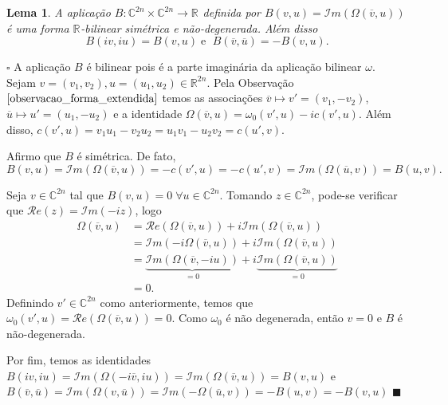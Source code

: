 \documentclass[12pt]{book}
\newtheorem{lema}[teorema]{Lema}
\newenvironment{prova}[1]{$\square$ #1}{\hfill$\blacksquare$}
\newcommand{\complexo}[1]{\mathbb{C}^{#1}}
\newcommand{\formaSimpleticaExtendida}[2]{\Omega(#1, #2)}
\newcommand{\formaSimpleticaPadrao}[2]{\omega_{0}(#1, #2)}
\newcommand{\parteImaginaria}[1]{\mathcal{I}m(#1)}
\newcommand{\parteReal}[1]{\mathcal{R}e(#1)}
\newcommand{\real}[1]{\mathbb{R}^{#1}}
\newcommand{\reta}{\real{}}
\begin{document}
	\begin{lema}
		A aplicação $B:\complexo{2n}\times \complexo{2n} \to \reta$ definida por $B(v, u ) = \parteImaginaria{\formaSimpleticaExtendida{\overline{v}}{u}}$ é uma forma $\reta$-bilinear simétrica e não-degenerada. Além disso
		$$
		B(iv,iu) = B(v,u)\;\text{e }\;B(\overline{v},\overline{u})=-B(v,u).
		$$
	\end{lema}
	\begin{prova}
		A aplicação $B$ é bilinear pois é a parte imaginária da aplicação bilinear $\omega$. Sejam $v = (v_{1},  v_{2}), u = (u_{1},  u_{2}) \in \real{2n}$. Pela Observação $\ref{observacao_forma_extendida}$ temos as associações $\overline{v}\mapsto v' = (v_{1}, -v_{2})$,  $\overline{u}\mapsto u' = (u_{1}, -u_{2})$ e a identidade $\formaSimpleticaExtendida{\overline{v}}{u} = \formaSimpleticaPadrao{v'}{u} -ic(v',u)$. Além disso, $c(v',u) = v_{1}u_{1} - v_{2}u_{2} = u_{1}v_{1} - u_{2}v_{2} = c(u',v)$. 
		
		Afirmo que $B$ é simétrica. De fato,
		$$B(v,u) =\parteImaginaria{\formaSimpleticaExtendida{\overline{v}}{u}} =-c(v',u) = -c(u',v) = \parteImaginaria{\formaSimpleticaExtendida{\overline{u}}{v}} = B(u,v).
		$$
		
		Seja $v \in \complexo{2n}$ tal que $B(v, u) = 0 \; \forall u \in \complexo{2n}$. Tomando $z \in \complexo{2n}$, pode-se verificar que $\parteReal{z} = \parteImaginaria{-iz}$, logo 
		$$
		\begin{aligned}
		\formaSimpleticaExtendida{\overline{v}}{u} &=\parteReal{\formaSimpleticaExtendida{\overline{v}}{u}} +i \parteImaginaria{\formaSimpleticaExtendida{\overline{v}}{u}} 
		\\
		&= \parteImaginaria{-i\formaSimpleticaExtendida{\overline{v}}{u}} +i \parteImaginaria{\formaSimpleticaExtendida{\overline{v}}{u}}
		\\
		&= \underbrace{\parteImaginaria{\formaSimpleticaExtendida{\overline{v}}{-iu}}}_{=0} +i \underbrace{\parteImaginaria{\formaSimpleticaExtendida{\overline{v}}{u}}}_{=0}
		\\
		&=0.
		\end{aligned}
		$$
		Definindo $v'\in \complexo{2n}$ como anteriormente, temos que $\formaSimpleticaPadrao{v'}{u} = \parteReal{\formaSimpleticaExtendida{\overline{v}}{u}} = 0$. Como $\omega_{0}$ é não degenerada, então $v = 0$ e $B$ é não-degenerada.
		
		Por fim, temos as identidades $B(iv,iu) = \parteImaginaria{\formaSimpleticaExtendida{-i\overline{v}}{iu}}= \parteImaginaria{\formaSimpleticaExtendida{\overline{v}}{u}}=B(v,u)$ e $B(\overline{v},\overline{u})  = \parteImaginaria{\formaSimpleticaExtendida{v}{\overline{u}}} = \parteImaginaria{-\formaSimpleticaExtendida{\overline{u}}{v}} = -B(u,v) = -B(v,u)$
	\end{prova}
	
\end{document}
